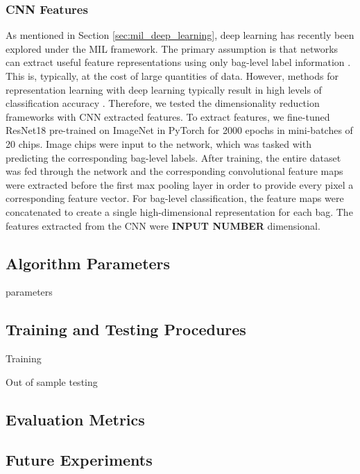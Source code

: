 \subsubsection{CNN Features}
As mentioned in Section \ref{sec:mil_deep_learning}, deep learning has recently been explored under the MIL framework.  The primary assumption is that networks can extract useful feature representations using only bag-level label information \citep{Ghaffarzadegan2018MILVAE}.  This is, typically, at the cost of large quantities of data.  However, methods for representation learning with deep learning typically result in high levels of classification accuracy \citep{Bengio2014RepLearningReview}.  Therefore, we tested the dimensionality reduction frameworks with CNN extracted features.  To extract features, we fine-tuned ResNet18 \citep{He2015ResNet} pre-trained on ImageNet \citep{Deng2009ImageNet} in PyTorch for 2000 epochs in mini-batches of 20 chips.  Image chips were input to the network, which was tasked with predicting the corresponding bag-level labels.  After training, the entire dataset was fed through the network and the corresponding convolutional feature maps were extracted before the first max pooling layer in order to provide every pixel a corresponding feature vector.  For bag-level classification, the feature maps were concatenated to create a single high-dimensional representation for each bag.  The features extracted from the CNN were \textbf{INPUT NUMBER} dimensional.

\subsection{Algorithm Parameters}
parameters

\subsection{Training and Testing Procedures}

Training

Out of sample testing


\subsection{Evaluation Metrics}


\subsection{Future Experiments}

